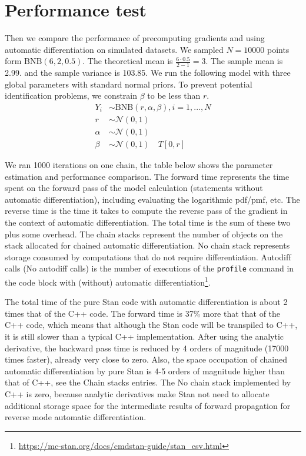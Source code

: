 \documentclass[11pt]{article}
\begin{document}
\section{Performance test}



Then we compare the performance of precomputing gradients and using automatic differentiation on simulated datasets. We sampled $N=10000$ points form $\text{BNB}(6,2,0.5)$. The theoretical mean is $\frac{6\cdot 0.5}{2-1}=3$. The sample mean is 2.99.  and the sample variance is 103.85.  We run the following model with three global parameters with standard normal priors. To prevent potential identification problems, we constrain $\beta$ to be less than $r$.
\begin{equation}
  \begin{aligned}
	Y_{i} &\sim \text{BNB}(r, \alpha, \beta), i=1,...,N\\
	r &\sim \mathcal{N}(0,1) \\
	\alpha &\sim \mathcal{N}(0,1) \\ 
	\beta &\sim \mathcal{N}(0,1) \quad T[0,r]
  \end{aligned}
\end{equation}

We ran 1000 iterations on one chain, the table below shows the parameter estimation and performance comparison. The forward time represents the time spent on the forward pass of the model calculation (statements without automatic differentiation), including evaluating the logarithmic pdf/pmf, etc. The reverse time is the time it takes to compute the reverse pass of the gradient in the context of automatic differentiation. The total time is the sum of these two plus some overhead. The chain stacks represent the number of objects on the stack allocated for chained automatic differentiation. No chain stack represents storage consumed by computations that do not require differentiation. Autodif‌f calls (No autodiff calls) is the number of executions of the \verb|profile| command in the code block with (without) automatic differentiation\footnote{\url{https://mc-stan.org/docs/cmdstan-guide/stan_csv.html}}.



The total time of the pure Stan code with automatic differentiation is about 2 times that of the C++ code. The forward time is 37\% more that that of the C++ code, which means that although the Stan code will be transpiled to C++, it is still slower than a typical C++ implementation. After using the analytic derivative, the backward pass time is reduced by 4 orders of magnitude (17000 times faster), already very close to zero. Also, the space occupation of chained automatic differentiation by pure Stan is 4-5 orders of magnitude higher than that of C++, see the Chain stacks entries. The No chain stack implemented by C++ is zero, because analytic derivatives make Stan not need to allocate additional storage space for the intermediate results of forward propagation for reverse mode automatic differentiation. 
\end{document}
